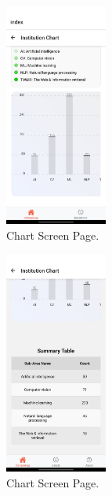 \documentclass[12pt]{article}
\begin{document}
\begin{figure}[H]
    \centering
    \includegraphics[width=0.3\textwidth, height=0.4\textheight]{chart1.jpg} %
    \caption{Chart Screen Page.}
    \label{fig:example_image}
\end{figure}
\begin{figure}[H]
    \centering
    \includegraphics[width=0.3\textwidth, height=0.4\textheight]{chart2.jpg} %
    \caption{Chart Screen Page.}
    \label{fig:example_image}
\end{figure}



\clearpage
\end{document}

